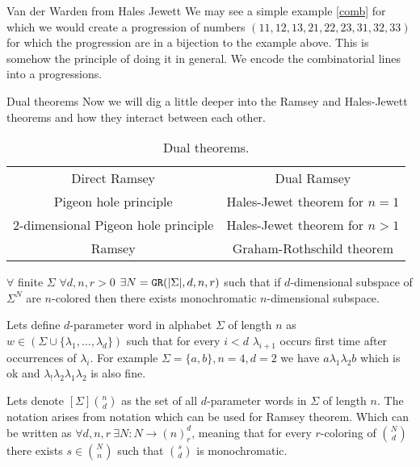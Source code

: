 \begin{topic}{Van der Warden from Hales Jewett}
	We may see a simple example \ref{comb} for which we would create a progression of numbers $(11, 12, 13, 21, 22, 23, 31, 32, 33)$ for which the progression are in a bijection to the example above. This is somehow the principle of doing it in general. We encode the combinatorial lines into a progressions.
\end{topic}

\begin{topic}{Dual theorems}
	Now we will dig a little deeper into the Ramsey and Hales-Jewett theorems and how they interact between each other.
	
	\begin{table}[!ht]\centering
		\begin{tabular}{| c | c |}
			\hline
			Direct Ramsey & Dual Ramsey \\
			Pigeon hole principle & Hales-Jewet theorem for $n = 1$ \\
			2-dimensional Pigeon hole principle & Hales-Jewet theorem for $n > 1$ \\
			Ramsey & Graham-Rothschild theorem \\
			\hline
		\end{tabular}
		\caption{Dual theorems.}
	\end{table}

	\begin{thm}
		$\forall$ finite $\Sigma$ $\forall d, n, r > 0$ $\exists N = \mathtt{GR}(|\Sigma|, d, n, r)$ such that if $d$-dimensional subspace of $\Sigma^N$ are $n$-colored then there exists monochromatic $n$-dimensional subspace.
		\label{gr-thm}
	\end{thm}

	
	Lets define $d$-parameter word in alphabet $\Sigma$ of length $n$ as $w \in (\Sigma \cup \{\lambda_1, \dots, \lambda_d\})$ such that for every $i < d$ $\lambda_{i+1}$ occurs first time after occurrences of $\lambda_i$. For example $\Sigma = \{a,b\}, n = 4, d = 2$ we have $a \lambda_1 \lambda_2 b$ which is ok and $\lambda_! \lambda_2 \lambda_1 \lambda_2$  is also fine.
	
	Lets denote $[\Sigma]\binom{n}{d}$ as the set of all $d$-parameter words in $\Sigma$ of length $n$. The notation arises from notation which can be used for Ramsey theorem. Which can be written as $\forall d, n, r \ \exists N: N \to (n)_r^d$, meaning that for every $r$-coloring of $\binom{N}{d}$ there exists $s \in \binom{N}{n}$ such that $\binom{s}{d}$ is monochromatic.
	

\end{topic}
